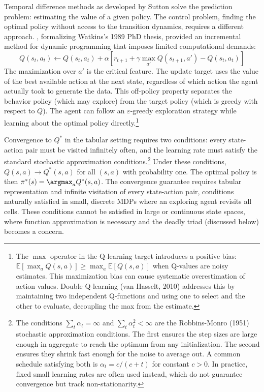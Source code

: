 Temporal difference methods as developed by Sutton solve the prediction problem: estimating the value of a given policy. The control problem, finding the optimal policy without access to the transition dynamics, requires a different approach. \citet{WatkinsDayan1992}, formalizing Watkins's 1989 PhD thesis, provided an incremental method for dynamic programming that imposes limited computational demands:
\begin{equation}
Q(s_t, a_t) \leftarrow Q(s_t, a_t) + \alpha \left[ r_{t+1} + \gamma \max_{a'} Q(s_{t+1}, a') - Q(s_t, a_t) \right]
\end{equation}
The maximization over $a'$ is the critical feature. The update target uses the value of the best available action at the next state, regardless of which action the agent actually took to generate the data. This off-policy property separates the behavior policy (which may explore) from the target policy (which is greedy with respect to $Q$). The agent can follow an $\varepsilon$-greedy exploration strategy while learning about the optimal policy directly.\footnote{The $\max$ operator in the Q-learning target introduces a positive bias: $\mathbb{E}[\max_a Q(s,a)] \geq \max_a \mathbb{E}[Q(s,a)]$ when Q-values are noisy estimates. This maximization bias can cause systematic overestimation of action values. Double Q-learning (van Hasselt, 2010) addresses this by maintaining two independent Q-functions and using one to select and the other to evaluate, decoupling the max from the estimate.}

Convergence to $Q^*$ in the tabular setting requires two conditions: every state-action pair must be visited infinitely often, and the learning rate must satisfy the standard stochastic approximation conditions.\footnote{The conditions $\sum_t \alpha_t = \infty$ and $\sum_t \alpha_t^2 < \infty$ are the Robbins-Monro (1951) stochastic approximation conditions. The first ensures the step sizes are large enough in aggregate to reach the optimum from any initialization. The second ensures they shrink fast enough for the noise to average out. A common schedule satisfying both is $\alpha_t = c / (c + t)$ for constant $c > 0$. In practice, fixed small learning rates are often used instead, which do not guarantee convergence but track non-stationarity.} Under these conditions, $Q(s,a) \to Q^*(s,a)$ for all $(s,a)$ with probability one. The optimal policy is then $\pi^*(s) = \argmax_a Q^*(s,a)$. The convergence guarantee requires tabular representation and infinite visitation of every state-action pair, conditions naturally satisfied in small, discrete MDPs where an exploring agent revisits all cells. These conditions cannot be satisfied in large or continuous state spaces, where function approximation is necessary and the deadly triad (discussed below) becomes a concern.

